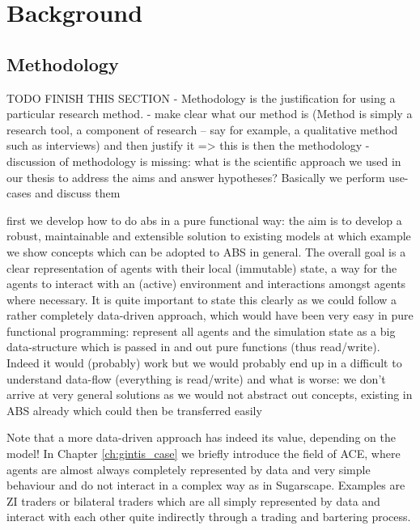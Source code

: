 \chapter{Background}
\label{ch:background}







\section{Methodology}
TODO FINISH THIS SECTION
- Methodology is the justification for using a particular research method.
- make clear what our method is (Method is simply a research tool, a component of research – say for example, a qualitative method such as interviews) and then justify it => this is then the methodology 
- discussion of methodology is missing: what is the scientific approach we used in our thesis to address the aims and answer hypotheses? Basically we perform use-cases and discuss them

first we develop how to do abs in a pure functional way: the aim is to develop a robust, maintainable and extensible solution to existing models at which example we show concepts which can be adopted to ABS in general. The overall goal is a clear representation of agents with their local (immutable) state, a way for the agents to interact with an (active) environment and interactions amongst agents where necessary. It is quite important to state this clearly as we could follow a rather completely data-driven approach, which would have been very easy in pure functional programming: represent all agents and the simulation state as a big data-structure which is passed in and out pure functions (thus read/write). Indeed it would (probably) work but we would probably end up in a difficult to understand data-flow (everything is read/write) and what is worse: we don't arrive at very general solutions as we would not abstract out concepts, existing in ABS already which could then be transferred easily

Note that a more data-driven approach has indeed its value, depending on the model! In Chapter \ref{ch:gintis_case} we briefly introduce the field of ACE, where agents are almost always completely represented by data and very simple behaviour and do not interact in a complex way as in Sugarscape. Examples are ZI traders or bilateral traders which are all simply represented by data and interact with each other quite indirectly through a trading and bartering process.

